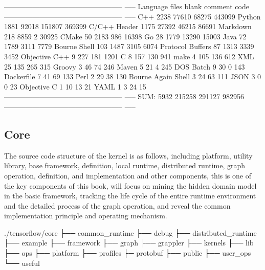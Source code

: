 \begin{content}
\begin{leftbar}
\begin{python}[caption={TensorFlowCode Stats}]
-------------------------------------------------- -----
Language             files    blank    comment    code
-------------------------------------------------- -----
C++                   2238    77610     68275    443099
Python                1881    92018    151807    369399
C/C++ Header          1175    27392     46215     86691
Markdown 218 8859 2 30925
CMake                   50     2183       986     16398
Go                      28     1779     13290     15003
Java                    72     1789      3111      7779
Bourne Shell           103     1487      3105      6074
Protocol Buffers        87     1313      3339      3452
Objective C++            9      227       181      1201
C                        8      157       130       941
make                     4      105       136       612
XML                     25      135       265       315
Groovy                   3       46        74       246
Maven                    5       21         4       245
DOS Batch 9 30 0 143
Dockerfile               7       41        69       133
Perl                     2       29        38       130
Bourne Again Shell       3       24        63       111
JSON                     3        0         0        23
Objective C              1       10        13        21
YAML 1 3 24 15
-------------------------------------------------- -----
SUM:                  5932   215258    291127    982956
-------------------------------------------------- -----
\end{python}
\end{leftbar}


\subsection{Core}
The source code structure of the kernel is as follows, including platform, utility library, base framework,  definition, local runtime, distributed runtime, graph operation,  definition, and  implementation and other components, this is one of the key components of this book, will focus on mining the hidden domain model in the basic framework, tracking the life cycle of the entire runtime environment and the detailed process of the graph operation, and reveal the common   implementation principle and operating mechanism.

\begin{leftbar}
\begin{c++}[caption={Core source structure}]
./tensorflow/core
├── common_runtime
├── debug
├── distributed_runtime
├── example
├── framework
├── graph
├── grappler
├── kernels
├── lib
├── ops
├── platform
├── profiles
├─ protobuf
├── public
├── user_ops
└── useful
\end{c++}
\end{leftbar}


\end{content}

